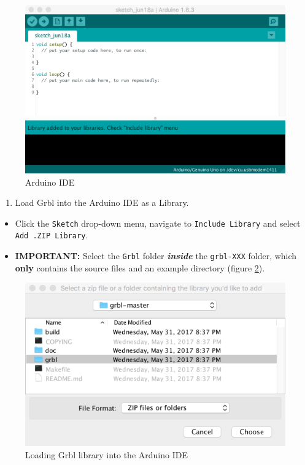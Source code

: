 \documentclass[]{book}
\providecommand{\tightlist}{%
  \setlength{\itemsep}{0pt}\setlength{\parskip}{0pt}}
\theoremstyle{definition}
\theoremstyle{definition}
\theoremstyle{remark}
\begin{document}
\begin{figure}

{\centering \includegraphics[width=0.75\linewidth]{images/arduino_IDE} 

}

\caption{Arduino IDE}\label{fig:arduinoIDE}
\end{figure}

\begin{enumerate}
\def\labelenumi{\arabic{enumi}.}
\setcounter{enumi}{2}
\tightlist
\item
  Load Grbl into the Arduino IDE as a Library.
\end{enumerate}

\begin{itemize}
\tightlist
\item
  Click the \texttt{Sketch} drop-down menu, navigate to
  \texttt{Include\ Library} and select \texttt{Add\ .ZIP\ Library}.
\item
  \textbf{IMPORTANT:} Select the \texttt{Grbl} folder
  \textbf{\emph{inside}} the \texttt{grbl-XXX} folder, which
  \textbf{only} contains the source files and an example directory
  (figure \ref{fig:addGrblLib}).
\end{itemize}

\begin{figure}

{\centering \includegraphics[width=0.75\linewidth]{images/add_grbl_lib} 

}

\caption{Loading Grbl library into the Arduino IDE}\label{fig:addGrblLib}
\end{figure}
\end{document}
